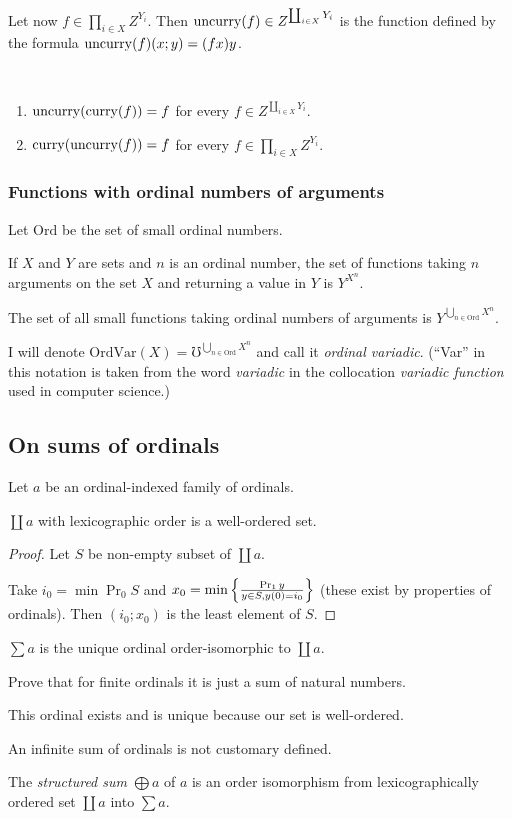 Let now $f\in\prod_{i\in X}Z^{Y_{i}}$. Then $\operatorname{uncurry}(f)\in Z^{\coprod_{i\in X}Y_{i}}$
is the function defined by the formula $\operatorname{uncurry}(f)(x;y)=(fx)y$.
\begin{obvious}
~
\begin{enumerate}
\item $\operatorname{uncurry}(\operatorname{curry}(f))=f$ for every $f\in Z^{\coprod_{i\in X}Y_{i}}$.
\item $\operatorname{curry}(\operatorname{uncurry}(f))=f$ for every $f\in\prod_{i\in X}Z^{Y_{i}}$.
\end{enumerate}
\end{obvious}

\subsubsection{Functions with ordinal numbers of arguments}

Let $\mathrm{Ord}$ be the set of small ordinal numbers.

If $X$ and $Y$ are sets and $n$ is an ordinal number, the set of
functions taking $n$ arguments on the set $X$ and returning a value
in $Y$ is $Y^{X^{n}}$.

The set of all small functions taking ordinal numbers of arguments
is $Y^{\bigcup_{n\in\mathrm{Ord}}X^{n}}$.

I will denote $\mathrm{OrdVar}(X)=\mho^{\bigcup_{n\in\mathrm{Ord}}X^{n}}$
and call it \emph{ordinal variadic}. (``Var'' in this notation is
taken from the word \emph{variadic} in the collocation \emph{variadic
function} used in computer science.)


\subsection{On sums of ordinals}

Let $a$ be an ordinal-indexed family of ordinals.
\begin{prop}
$\coprod a$ with lexicographic order is a well-ordered set.\end{prop}
\begin{proof}
Let $S$ be non-empty subset of $\coprod a$.

Take $i_{0}=\min\Pr_{0}S$ and $x_{0}=\min\left\{ \frac{\Pr_{1}y}{y\in S,y(0)=i_{0}}\right\}$
(these exist by properties of ordinals). Then $(i_{0};x_{0})$ is
the least element of $S$.\end{proof}
\begin{defn}
$\sum a$ is the unique ordinal order-isomorphic to $\coprod a$.\end{defn}
\begin{xca}
Prove that for finite ordinals it is just a sum of natural numbers.
\end{xca}
This ordinal exists and is unique because our set is well-ordered.
\begin{rem}
An infinite sum of ordinals is not customary defined.
\end{rem}
The \emph{structured sum} $\bigoplus a$ of
$a$ is an order isomorphism from lexicographically ordered set $\coprod a$
into $\sum a$.

